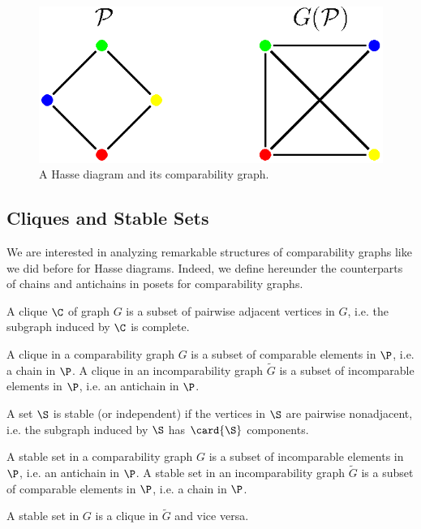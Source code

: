 \begin{figure}
\centering
\includegraphics[height=0.15\textheight]{fig/comp-graph}
\caption{\label{fig:comp-graph} A Hasse diagram and its comparability graph.}
\end{figure}




\subsection{Cliques and Stable Sets}

We are interested in analyzing remarkable structures of comparability graphs
like we did before for Hasse diagrams. Indeed, we define hereunder the
counterparts of chains and antichains in posets for comparability graphs.

\begin{definition}[Clique]
A clique $\C$ of graph $G$ is a subset of pairwise adjacent vertices in $G$,
i.e. the subgraph induced by $\C$ is complete.
\end{definition}
A clique in a comparability graph ${G}$ is a subset of comparable elements in
$\P$, i.e. a chain in $\P$.
A clique in an incomparability graph $\widetilde{G}$ is a subset of
incomparable  elements in $\P$, i.e. an antichain in $\P$.

\begin{definition}
A set $\S$ is stable (or independent) if the vertices in $\S$ are pairwise
nonadjacent, i.e. the subgraph induced by $\S$ has $\card{\S}$ components.
\end{definition}
A stable set in a comparability graph ${G}$ is a subset of incomparable
elements in $\P$, i.e. an antichain in $\P$.
A stable set in an incomparability graph $\widetilde{G}$ is a subset of
comparable elements in $\P$, i.e. a chain in $\P$.


A stable set in ${G}$ is a clique in $\widetilde{G}$ and vice versa.



